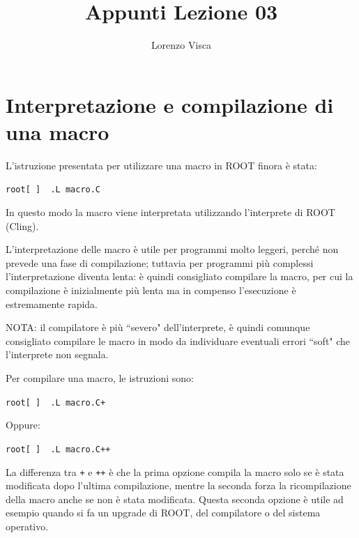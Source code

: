 \documentclass[10pt]{article}
\title{Appunti Lezione 03}
\author{Lorenzo Visca}
\date{}
\newcommand{\ttt}{\texttt}
\newcommand{\troot}[1]{\hspace{10pt}\colorbox{bashbackground}{\textcolor{bashtext}{\texttt{root[~]~~#1}}}}
\begin{document}
\maketitle

\section{Interpretazione e compilazione di una macro}
L'istruzione presentata per utilizzare una macro in ROOT finora è stata:

\vspace{5pt}

\hspace{5pt}\troot{.L macro.C}

\vspace{5pt}

In questo modo la macro viene interpretata utilizzando l'interprete di ROOT (Cling).

L'interpretazione delle macro è utile per programmi molto leggeri, perché non prevede una fase di compilazione;
tuttavia per programmi più complessi l'interpretazione diventa lenta: è quindi consigliato compilare la macro, per cui la compilazione è inizialmente più lenta ma in compenso l'esecuzione è estremamente rapida.

NOTA: il compilatore è più “severo" dell'interprete, è quindi comunque consigliato compilare le macro in modo da individuare eventuali errori “soft" che l'interprete non segnala.

Per compilare una macro, le istruzioni sono:

\vspace{5pt}

\hspace{5pt}\troot{.L macro.C+}

\vspace{5pt}

Oppure:

\vspace{5pt}

\hspace{5pt}\troot{.L macro.C++}

\vspace{5pt}

La differenza tra \ttt{+} e \ttt{++} è che la prima opzione compila la macro solo se è stata modificata dopo l'ultima compilazione, mentre la seconda forza la ricompilazione della macro anche se non è stata modificata.
Questa seconda opzione è utile ad esempio quando si fa un upgrade di ROOT, del compilatore o del sistema operativo.
\end{document}
